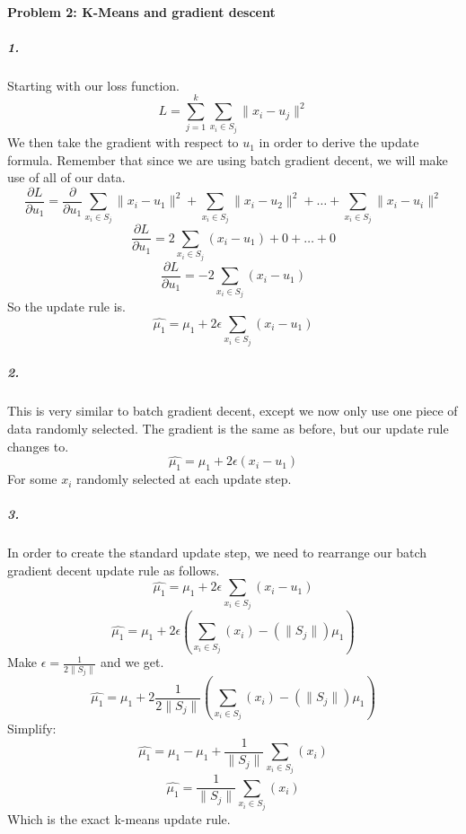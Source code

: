 \documentclass[12pt]{article}
\begin{document}
    \paragraph{Problem 2: K-Means and gradient descent}
    \subparagraph{1.}
    Starting with our loss function.
    \[
        L = \sum_{j=1}^{k} \sum_{x_i \in S_j} \parallel x_i - u_j \parallel ^ {2}
    \]
    We then take the gradient with respect to \(u_1\) in order to derive the update formula. Remember that since
    we are using batch gradient decent, we will make use of all of our data.
    \[
        \frac{\partial L}{\partial u_1} = \frac{\partial}{\partial u_1}
        \sum_{x_i \in S_j} \parallel x_i - u_1 \parallel ^ {2} +
        \sum_{x_i \in S_j} \parallel x_i - u_2 \parallel ^ {2} +
        \dots +
        \sum_{x_i \in S_j} \parallel x_i - u_i \parallel ^ {2}
    \]
    \[
        \frac{\partial L}{\partial u_1} =
        2\sum_{x_i \in S_j}  (x_i - u_1) +
        0 +
        \dots +
        0
    \]
    \[
        \frac{\partial L}{\partial u_1} =
        -2\sum_{x_i \in S_j}  (x_i - u_1)
    \]
    So the update rule is.
    \[
        \hat{\mu_1} = \mu_1 + 2 \epsilon \sum_{x_i \in S_j}  (x_i - u_1)
    \]
    \subparagraph{2.}
    This is very similar to batch gradient decent, except we now only use one piece of data randomly selected.
    The gradient is the same as before, but our update rule changes to.
    \[
        \hat{\mu_1} = \mu_1 + 2 \epsilon (x_i - u_1)
    \]
    For some \(x_i\) randomly selected at each update step.
    \subparagraph{3.}
    In order to create the standard update step, we need to rearrange our batch gradient decent update rule as follows.
    \[
        \hat{\mu_1} = \mu_1 + 2 \epsilon \sum_{x_i \in S_j}  (x_i - u_1)
    \]
    \[
        \hat{\mu_1} = \mu_1 + 2 \epsilon \left( \sum_{x_i \in S_j}  (x_i)  - (\parallel S_j \parallel) \mu_1 \right)
    \]
    Make \(\epsilon = \frac{1}{2 \parallel S_j \parallel}\) and we get.
    \[
        \hat{\mu_1} = \mu_1 + 2 \frac{1}{2 \parallel S_j \parallel} \left( \sum_{x_i \in S_j}  (x_i)  - (\parallel S_j \parallel) \mu_1 \right)
    \]
    Simplify:
    \[
        \hat{\mu_1} = \mu_1 - \mu_1 + \frac{1}{\parallel S_j \parallel}\sum_{x_i \in S_j}  (x_i)
    \]
    \[
        \hat{\mu_1} = \frac{1}{\parallel S_j \parallel}\sum_{x_i \in S_j}  (x_i)
    \]
    Which is the exact k-means update rule.
\end{document}
